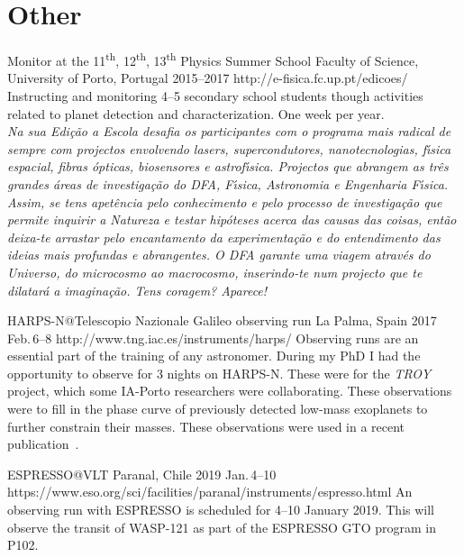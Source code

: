 \section{Other}\label{app_sec:other}

{Monitor at the 11\textsuperscript{th}, 12\textsuperscript{th}, 13\textsuperscript{th} Physics Summer School}
{Faculty of Science, University of Porto, Portugal}%
{2015--2017}%
{http://e-fisica.fc.up.pt/edicoes/}%
{}%
{Instructing and monitoring 4--5 secondary school students though activities related to planet detection and characterization.
One week per year.\\
  \emph{Na sua Edi\c{c}\~{a}o a Escola desafia os participantes com o programa mais radical de sempre com projectos envolvendo lasers, supercondutores, nanotecnologias, f\'{\i}sica espacial, fibras \'{o}pticas, biosensores e astrof\'{\i}sica.
      Projectos que abrangem as tr\^{e}s grandes áreas de investiga\c{c}\~{a}o do DFA, F\'{\i}sica, Astronomia e Engenharia F\'{\i}sica.
      Assim, se tens apet\^{e}ncia pelo conhecimento e pelo processo de investiga\c{c}\~{a}o que permite inquirir a Natureza e testar hip\'{o}teses acerca das causas das coisas, ent\~{a}o deixa-te arrastar pelo encantamento da experimenta\c{c}\~{a}o e do entendimento das ideias mais profundas e abrangentes.
      O DFA garante uma viagem através do Universo, do microcosmo ao macrocosmo, inserindo-te num projecto que te dilatar\'{a} a imagina\c{c}\~{a}o.
Tens coragem? Aparece!}}%


{HARPS-N@Telescopio Nazionale Galileo observing run}
{La Palma, Spain}%
{2017 Feb.\,6--8}%
{http://www.tng.iac.es/instruments/harps/}%
{}%
{Observing runs are an essential part of the training of any astronomer.
    During my PhD I had the opportunity to observe for 3 nights on {HARPS-N}.
    These were for the \emph{TROY} project, which some IA-Porto researchers were collaborating.
    These observations were to fill in the phase curve of previously detected low-mass exoplanets to further constrain their masses.
These observations were used in a recent publication~\citet{lillo-box_troy_2018}.
}%


{ESPRESSO@VLT}
{Paranal, Chile} %
{2019 Jan.\,4--10} %
{https://www.eso.org/sci/facilities/paranal/instruments/espresso.html} %
{}%
{An observing run with ESPRESSO is scheduled for 4--10 January 2019.
This will observe the transit of WASP-121 as part of the ESPRESSO GTO program in P102.}
